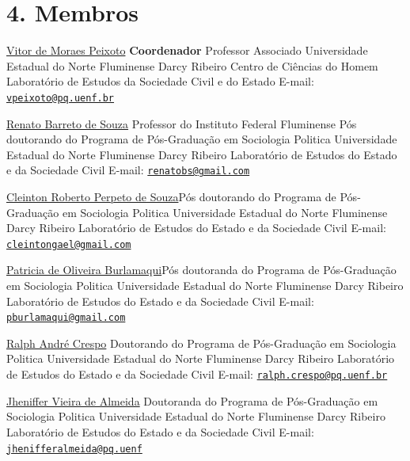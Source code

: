 \documentclass[
  12pt,
]{report}
\begin{document}
\hypertarget{membros}{%
\section{4. Membros}\label{membros}}

\href{http://lattes.cnpq.br/4676437210734787}{Vitor de Moraes Peixoto}
\hfill\break \textbf{Coordenador} \hfill\break Professor Associado
\hfill\break Universidade Estadual do Norte Fluminense Darcy Ribeiro
\hfill\break Centro de Ciências do Homem \hfill\break Laboratório de
Estudos da Sociedade Civil e do Estado \hfill\break E-mail:
\href{mailto:vpeixoto@pq.uenf.br}{\nolinkurl{vpeixoto@pq.uenf.br}}
\hfill\break

\href{http://lattes.cnpq.br/4208615645719699}{Renato Barreto de Souza}
\hfill\break Professor do Instituto Federal Fluminense \hfill\break Pós
doutorando do Programa de Pós-Graduação em Sociologia Politica
\hfill\break Universidade Estadual do Norte Fluminense Darcy Ribeiro
\hfill\break Laboratório de Estudos do Estado e da Sociedade Civil
\hfill\break E-mail:
\href{mailto:renatobs@gmail.com}{\nolinkurl{renatobs@gmail.com}}
\hfill\break

\href{http://lattes.cnpq.br/9603711186053943}{Cleinton Roberto Perpeto
de Souza}\hfill\break Pós doutorando do Programa de Pós-Graduação em
Sociologia Politica \hfill\break Universidade Estadual do Norte
Fluminense Darcy Ribeiro \hfill\break Laboratório de Estudos do Estado e
da Sociedade Civil \hfill\break E-mail:
\href{mailto:cleintongael@gmail.com}{\nolinkurl{cleintongael@gmail.com}}
\hfill\break

\href{http://lattes.cnpq.br/6620703529177610}{Patricia de Oliveira
Burlamaqui}\hfill\break Pós doutoranda do Programa de Pós-Graduação em
Sociologia Politica \hfill\break Universidade Estadual do Norte
Fluminense Darcy Ribeiro \hfill\break Laboratório de Estudos do Estado e
da Sociedade Civil \hfill\break E-mail:
\href{mailto:pburlamaqui@gmail.com}{\nolinkurl{pburlamaqui@gmail.com}}
\hfill\break

\href{http://lattes.cnpq.br/7250750885312461}{Ralph André Crespo}
\hfill\break Doutorando do Programa de Pós-Graduação em Sociologia
Politica \hfill\break Universidade Estadual do Norte Fluminense Darcy
Ribeiro \hfill\break Laboratório de Estudos do Estado e da Sociedade
Civil \hfill\break E-mail:
\href{mailto:ralph.crespo@pq.uenf.br}{\nolinkurl{ralph.crespo@pq.uenf.br}}
\hfill\break

\href{http://lattes.cnpq.br/1477388811747167}{Jheniffer Vieira de
Almeida} \hfill\break Doutoranda do Programa de Pós-Graduação em
Sociologia Politica \hfill\break Universidade Estadual do Norte
Fluminense Darcy Ribeiro \hfill\break Laboratório de Estudos do Estado e
da Sociedade Civil \hfill\break E-mail:
\href{mailto:jhenifferalmeida@pq.uenf}{\nolinkurl{jhenifferalmeida@pq.uenf}}
\hfill\break
\end{document}
